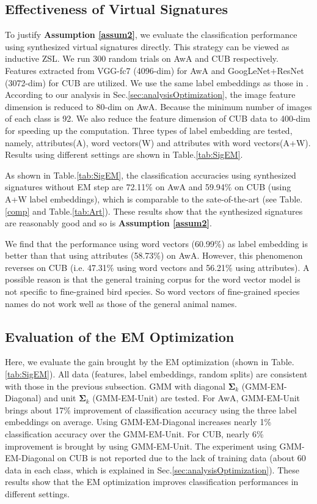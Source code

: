 \documentclass{article}
\begin{document}
\subsection{Effectiveness of Virtual Signatures}
\label{sec:recon}
To justify \textbf{Assumption \ref{assum2}}, we evaluate the classification performance using synthesized virtual signatures directly. This strategy can be viewed as inductive ZSL. We run 300 random trials on AwA and CUB respectively. Features extracted from VGG-fc7 (4096-dim) for AwA and GoogLeNet+ResNet (3072-dim) for CUB are utilized. We use the same label embeddings as those in \cite{wang2016relational}. According to our analysis in Sec.\ref{sec:analysisOptimization}, the image feature dimension is reduced to 80-dim on AwA. Because the minimum number of images of each class is 92. We also reduce the feature dimension of CUB data to 400-dim for speeding up the computation. Three types of label embedding are tested, namely, attributes(A), word vectors(W) and attributes with word vectors(A+W). Results using different settings are shown in Table.\ref{tab:SigEM}.

As shown in Table.\ref{tab:SigEM}, the classification accuracies using synthesized signatures without EM step are 72.11\% on AwA and 59.94\% on CUB (using A+W label embeddings), which is comparable to the sate-of-the-art (see Table.\ref{comp} and Table.\ref{tab:Art}). These results show that the synthesized signatures are reasonably good and so is \textbf{Assumption \ref{assum2}}.

We find that the performance using word vectors (60.99\%) as label embedding is better than that using attributes (58.73\%) on AwA. However, this phenomenon reverses on CUB (i.e. 47.31\% using word vectors and 56.21\% using attributes). A possible reason is that the general training corpus for the word vector model is not specific to fine-grained bird species. So word vectors of fine-grained species names do not work well as those of the general animal names.

\subsection{Evaluation of the EM Optimization} \label{sec:EM}
Here, we evaluate the gain brought by the EM optimization (shown in Table.\ref{tab:SigEM}). All data (features, label embeddings, random splits) are consistent with those in the previous subsection. GMM with diagonal $\bm{\Sigma}_k$ (GMM-EM-Diagonal) and unit $\bm{\Sigma}_k$ (GMM-EM-Unit) are tested. For AwA, GMM-EM-Unit brings about 17\%  improvement of classification accuracy using the three label embeddings on average. Using GMM-EM-Diagonal increases nearly 1\% classification accuracy over the GMM-EM-Unit. For CUB, nearly 6\% improvement is brought by using GMM-EM-Unit. The experiment using GMM-EM-Diagonal on CUB is not reported due to the lack of training data (about 60 data in each class, which is explained in Sec.\ref{sec:analysisOptimization}). These results show that the EM optimization improves classification performances in different settings.
\end{document}
